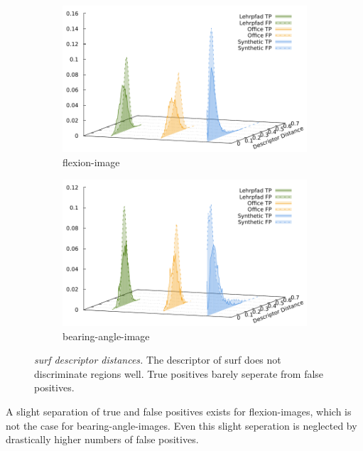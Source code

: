 \begin{figure}[H]
\begin{subfigure}[t]{0.45\linewidth}
    \includegraphics[width=\linewidth]{chapter06/results/SURF/flexion/descriptor_distances.pdf}%
    \caption{\gls{flexion-image}}
\end{subfigure}\quad
\begin{subfigure}[t]{0.45\linewidth}
    \includegraphics[width=\linewidth]{chapter06/results/SURF/bearing/descriptor_distances.pdf}%
    \caption{\gls{bearing-angle-image}}
\end{subfigure}
\caption[\acrshort{surf} descriptor distances]{\emph{\acrshort{surf} descriptor distances.} The descriptor of \acrshort{surf} does not discriminate regions well. True positives barely seperate from false positives.}\label{fig:surf_descriptor_distance}
\end{figure}
A slight separation of true and false positives exists for \glspl{flexion-image}, which is not the case for \glspl{bearing-angle-image}.
Even this slight seperation is neglected by drastically higher numbers of false positives.
